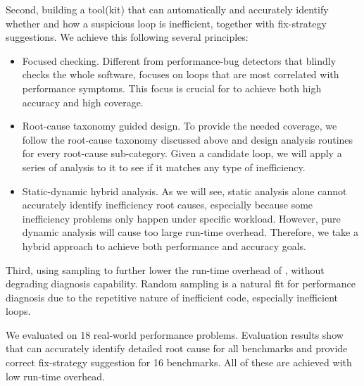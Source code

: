 Second, building a tool(kit) \Tool that can automatically and accurately
identify whether and how a suspicious loop is inefficient, 
together with fix-strategy suggestions. 
We achieve this following several principles:

\begin{itemize}
\item Focused checking. 
Different from performance-bug detectors that blindly checks the whole
software, \Tool focuses on loops that are
most correlated with performance symptoms. 
This focus is crucial for \Tool to achieve both high
accuracy and high coverage.

\item Root-cause taxonomy guided design. To provide the needed coverage, we follow
the root-cause taxonomy discussed above and design analysis routines for 
every root-cause sub-category. Given a candidate loop, we will 
apply a series of analysis to it to see if it matches any type of inefficiency.

\item Static-dynamic hybrid analysis.
As we will see, static analysis alone cannot accurately identify 
inefficiency root causes, especially because some inefficiency problems only
happen under specific workload. However, pure dynamic analysis will 
cause too large 
run-time overhead. Therefore, we take a hybrid approach to achieve both
performance and accuracy goals.
\end{itemize}

Third, using sampling to further lower the run-time overhead of \Tool, without
degrading diagnosis capability. Random sampling is a natural fit for performance
diagnosis due to the repetitive nature of inefficient code, especially
inefficient loops.

We evaluated \Tool on 18 real-world performance problems. 
Evaluation results show that \Tool can accurately identify detailed
root cause for all benchmarks and provide correct fix-strategy suggestion for
16 benchmarks. All of these are achieved with low run-time overhead.
